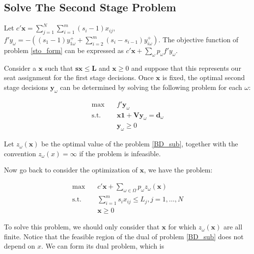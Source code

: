 \subsection{Solve The Second Stage Problem}

Let $c{'}\mathbf{x} = \sum_{j =1}^{N} \sum_{i=1}^m (s_i-1) x_{ij}$, $f{'}y_{\omega} = -\left((s_1-1)y_{1 \omega}^{+} + \sum_{i=2}^{m}(s_{i}-s_{i-1}) y_{i \omega}^{+}\right)$. The objective function of problem \eqref{sto_form} can be expressed as $c{'}\mathbf{x} + \sum_{\omega} p_{\omega}f{'}y_{\omega}$.

Consider a $\mathbf{x}$ such that $\mathbf{s x} \leq \mathbf{L}$ and $\mathbf{x} \geq 0$ and suppose that this represents our seat assignment for the first stage decisions. Once $\mathbf{x}$ is fixed, the optimal second stage decisions $\mathbf{y}_{\omega}$ can be determined by solving the following problem for each $\omega$:

\begin{equation}\label{BD_sub}
\begin{aligned}
  \max \quad & f{'} \mathbf{y}_{\omega} \\
  \text {s.t.} \quad & \mathbf{x} \mathbf{1} + \mathbf{V} \mathbf{y}_\omega = \mathbf{d}_\omega \\
   & \mathbf{y}_{\omega} \geq 0
\end{aligned}
\end{equation}


Let $z_{\omega}(\mathbf{x})$ be the optimal value of the problem \eqref{BD_sub}, together with the convention $z_{\omega}(x) = \infty$ if the problem is infeasible. 

Now go back to consider the optimization of $\mathbf{x}$, we have the problem:

\begin{equation}\label{BD_master}
  \begin{aligned}
    \max \quad & c{'} \mathbf{x} + \sum_{\omega \in \Omega} p_{\omega} z_{\omega}(\mathbf{x}) \\
    \text {s.t.} \quad & \sum_{i=1}^{m} s_{i} x_{ij} \leq L_j, j =1,\ldots, N \\
     & \mathbf{x} \geq 0
  \end{aligned}
\end{equation}

To solve this problem, we should only consider that $\mathbf{x}$ for which $z_{\omega}(\mathbf{x})$ are all finite. Notice that the feasible region of the dual of problem \eqref{BD_sub} does not depend on $x$. We can form its dual problem, which is 

